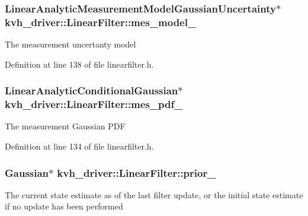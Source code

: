 \subsubsection[{mes\-\_\-model\-\_\-}]{\setlength{\rightskip}{0pt plus 5cm}\-Linear\-Analytic\-Measurement\-Model\-Gaussian\-Uncertainty$\ast$ {\bf kvh\-\_\-driver\-::\-Linear\-Filter\-::mes\-\_\-model\-\_\-}\hspace{0.3cm}{\ttfamily  [protected]}}\label{classkvh__driver_1_1LinearFilter_ab8fa55248628d448aff192958c761db7}
\-The measurement uncertanty model 

\-Definition at line 138 of file linearfilter.\-h.

\subsubsection[{mes\-\_\-pdf\-\_\-}]{\setlength{\rightskip}{0pt plus 5cm}\-Linear\-Analytic\-Conditional\-Gaussian$\ast$ {\bf kvh\-\_\-driver\-::\-Linear\-Filter\-::mes\-\_\-pdf\-\_\-}\hspace{0.3cm}{\ttfamily  [protected]}}\label{classkvh__driver_1_1LinearFilter_a04843282023c646a6a3e1ff08a4fd73b}
\-The measurement \-Gaussian \-P\-D\-F 

\-Definition at line 134 of file linearfilter.\-h.

\subsubsection[{prior\-\_\-}]{\setlength{\rightskip}{0pt plus 5cm}\-Gaussian$\ast$ {\bf kvh\-\_\-driver\-::\-Linear\-Filter\-::prior\-\_\-}\hspace{0.3cm}{\ttfamily  [protected]}}\label{classkvh__driver_1_1LinearFilter_a87f9038b608e7ccfa21aad0c85b49040}
\-The current state estimate as of the last filter update, or the initial state estimate if no update has been performed 


